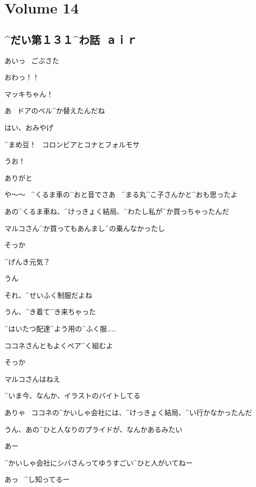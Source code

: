 \section{Volume 14}

\subsection{^{だい}{第}１３１^{わ}{話}\ ａｉｒ}

\page[6]
\Makki あいっ
\ ごぶさた

\Alpha おわっ！！

\Alpha マッキちゃん！

\Makki あ
\ ドアのベル^{か}{替}えたんだね

\page
\Makki はい、おみやげ

\Makki ^{まめ}{豆}！
\ コロンビアとコナとフォルモサ

\Alpha うお！

\Alpha ありがと

\Alpha や〜〜
\ ^{くるま}{車}の^{おと}{音}でさあ
\ ^{まる}{丸}^{こ}{子}さんかと^{おも}{思}ったよ

\Makki あの^{くるま}{車}ね、^{けっきょく}{結局}、^{わたし}{私}が^{か}{買}っちゃったんだ

\Makki マルコさん^{か}{買}ってもあんまし^{の}{乗}んなかったし

\Alpha そっか

\Alpha ^{げんき}{元気}？

\Makki うん

\page
\Alpha それ、^{せいふく}{制服}だよね

\Makki うん、^{き}{着}て^{き}{来}ちゃった

\Makki ^{はいたつ}{配達}^{よう}{用}の^{ふく}{服}……

\Makki ココネさんともよくペア^{く}{組}むよ

\Alpha そっか

\page
\Makki マルコさんはねえ

\Makki ^{いま}{今}、なんか、イラストのバイトしてる

\Alpha ありゃ
\ ココネの^{かいしゃ}{会社}には、^{けっきょく}{結局}、^{い}{行}かなかったんだ

\Makki うん、あの^{ひと}{人}なりのプライドが、なんかあるみたい

\Alpha あー

\Makki ^{かいしゃ}{会社}にシバさんってゆうすごい^{ひと}{人}がいてねー

\Alpha あっ
\ ^{し}{知}ってるー

